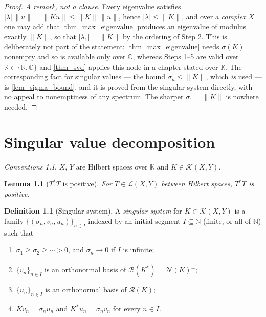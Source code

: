 \documentclass[a4paper]{report}
\theoremstyle{plain}
\newtheorem{lemma}[theorem]{Lemma}
\theoremstyle{definition}
\newtheorem{definition}[theorem]{Definition}
\theoremstyle{remark}
\newtheorem{assumptions}[theorem]{Conventions}
\begin{document}
\begin{proof}
  \emph{A remark, not a clause.}  Every eigenvalue satisfies
  $|\lambda|\,\|u\| = \|Ku\| \le \|K\|\,\|u\|$, hence $|\lambda| \le \|K\|$, and over a
  \emph{complex} $X$ one may add that \cref{thm_max_eigenvalue} produces an eigenvalue of
  modulus exactly $\|K\|$, so that $|\lambda_1| = \|K\|$ by the ordering of Step 2.  This is
  deliberately not part of the statement: \cref{thm_max_eigenvalue} needs $\sigma(K)$
  nonempty and so is available only over $\mathbb{C}$, whereas Steps 1--5 are valid over
  $\mathbb{K} \in \{\mathbb{R},\mathbb{C}\}$ and \cref{thm_svd} applies this node in a
  chapter stated over $\mathbb{K}$.  The corresponding fact for singular values ---
  the bound $\sigma_n \le \|K\|$, which \emph{is} used --- is \cref{lem_sigma_bound}, and
  it is proved from the singular system directly, with no appeal to nonemptiness of any
  spectrum.  The sharper $\sigma_1 = \|K\|$ is nowhere needed.
\end{proof}



\chapter{Singular value decomposition}
\label{ch_08_svd}

\begin{assumptions}
  \label{asm_singular_value_decomposition}
  $X$, $Y$ are Hilbert spaces over $\mathbb{K}$ and
$K \in \mathcal{K}(X,Y)$.
\end{assumptions}

\begin{lemma}[$T^*T$ is positive]
  \label{lem_adjoint_self_positive}
  For $T \in \mathcal{L}(X,Y)$ between Hilbert spaces, $T^*T$ is positive.
\end{lemma}



\begin{definition}[Singular system]
  \label{def_singular_system}
  A \emph{singular system} for $K \in \mathcal{K}(X,Y)$ is a family
  $\{(\sigma_n,v_n,u_n)\}_{n \in I}$ indexed by an initial segment
  $I \subseteq \mathbb{N}$ (finite, or all of $\mathbb{N}$) such that
  \begin{enumerate}
    \item $\sigma_1 \ge \sigma_2 \ge \cdots > 0$, and $\sigma_n \to 0$ if $I$ is infinite;
    \item $\{v_n\}_{n \in I}$ is an orthonormal basis of
      $\overline{\mathcal{R}(K^*)} = \mathcal{N}(K)^\perp$;
    \item $\{u_n\}_{n \in I}$ is an orthonormal basis of $\overline{\mathcal{R}(K)}$;
    \item $Kv_n = \sigma_n u_n$ and $K^*u_n = \sigma_n v_n$ for every $n \in I$.
  \end{enumerate}
\end{definition}
\end{document}
